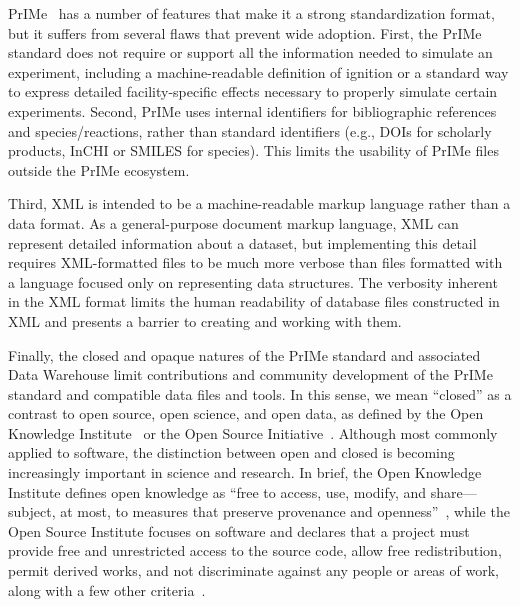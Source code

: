 \documentclass[12pt]{ijck}
\begin{document}
PrIMe~\autocite{Frenklach:2007bm,You:2011hy}
has a number of features that make
it a strong standardization format, but it suffers from several flaws that
prevent wide adoption. First, the PrIMe standard does not require or support all
the information needed to simulate an experiment, including a machine-readable
definition of ignition or a standard way to express detailed facility-specific
effects necessary to properly simulate certain experiments. Second, PrIMe uses
internal identifiers for bibliographic references and
species\slash reactions, rather than standard identifiers (e.g., DOIs for
scholarly products, InCHI or SMILES for species). This limits the usability of PrIMe files outside
the PrIMe ecosystem.

Third, XML is intended to be a machine-readable markup language rather than a data format.
As a general-purpose document markup language, XML can represent detailed
information about a dataset, but implementing this detail requires XML-formatted
files to be much more verbose than files formatted with a language focused
only on representing data structures. The verbosity inherent in the XML format
limits the human readability of database files constructed in XML and presents a barrier to
creating and working with them.

Finally, the closed and opaque natures of the PrIMe standard and associated Data Warehouse limit
contributions and community development of the PrIMe standard and compatible data files and tools.
In this sense, we mean ``closed'' as a contrast to open source, open science, and open data, as
defined by the Open Knowledge Institute~\cite{openknowledge} or the Open Source
Initiative~\cite{opensource}. Although most commonly applied to software, the distinction between
open and closed is becoming increasingly important in science and research. In brief, the Open
Knowledge Institute defines open knowledge as ``free to access, use, modify, and
share\textellipsis — subject, at most, to measures that preserve provenance and
openness''~\cite{openknowledge}, while the Open Source Institute focuses on software and declares
that a project must provide free and unrestricted access to the source code, allow free
redistribution, permit derived works, and not discriminate
against any people or areas of work, along with a few other criteria~\cite{opensource}.
\end{document}
